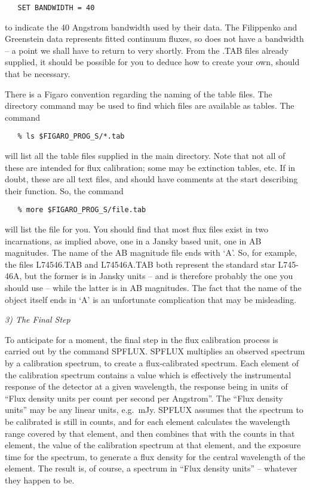 \begin{verbatim}
   SET BANDWIDTH = 40
\end{verbatim}

to indicate the 40 Angstrom bandwidth used by their data.  The Filippenko
and Greenstein data represents fitted continuum fluxes, so does not have
a bandwidth -- a point we shall have to return to very shortly.  From the .TAB
files already supplied, it should be possible for you to deduce how to
create your own, should that be necessary.

There is a Figaro convention regarding the
naming of the table files.  The directory command may be used to find
which files are available as tables.  The command

\begin{verbatim}
   % ls $FIGARO_PROG_S/*.tab
\end{verbatim}

will list all the table files supplied in the main directory.  Note that not 
all of these are intended for flux calibration; some may be extinction
tables, etc.  If in doubt, these are all text files, and should have
comments at the start describing their function.  So, the command

\begin{verbatim}
   % more $FIGARO_PROG_S/file.tab
\end{verbatim}

will list the file for you.  You should find that most flux files exist
in two incarnations, as implied above, one in a Jansky based unit, one
in AB magnitudes.  The name of the AB magnitude file ends with `A'.  So,
for example, the files L74546.TAB and L74546A\-.TAB both represent the
standard star L745-46A, but the former is in Jansky units -- and is
therefore probably the one you should use -- while the latter is in AB
magnitudes.  The fact that the name of the object itself ends in `A' 
is an unfortunate complication that may be misleading.


\goodbreak
\vspace{12pt}
{\it 3) The Final Step}

To anticipate for a moment, the final step in the flux calibration
process is carried out by the command SPFLUX.  SPFLUX multiplies an
observed spectrum by a calibration spectrum, to create a flux-calibrated
spectrum.  Each element of the calibration spectrum contains a value
which is effectively the instrumental response of the detector at a given
wavelength, the response being in units of ``Flux density units per
count per second per Angstrom''.  The ``Flux density units'' may be any
linear units, e.g.\ mJy.  SPFLUX assumes that the spectrum to be calibrated
is still in counts, and for each element calculates the wavelength range
covered by that element, and then combines that with the counts in that
element, the value of the calibration spectrum at that element, and the
exposure time for the spectrum, to generate a flux density for the
central wavelength of the element.  The result is, of course, a spectrum
in ``Flux density units'' -- whatever they happen to be.

